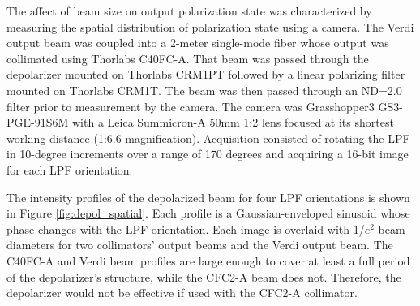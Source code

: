 The affect of beam size on output polarization state was characterized by measuring the spatial distribution of polarization state using a camera. The Verdi output beam was coupled into a 2-meter single-mode fiber whose output was collimated using Thorlabs C40FC-A. That beam was passed through the depolarizer mounted on Thorlabs CRM1PT followed by a linear polarizing filter mounted on Thorlabs CRM1T. The beam was then passed through an ND=2.0 filter prior to measurement by the camera. The camera was Grasshopper3 GS3-PGE-91S6M with a Leica Summicron-A 50mm 1:2 lens focused at its shortest working distance (1:6.6 magnification). Acquisition consisted of rotating the LPF in 10-degree increments over a range of 170 degrees and acquiring a 16-bit image for each LPF orientation.

The intensity profiles of the depolarized beam for four LPF orientations is shown in Figure \ref{fig:depol_spatial}. Each profile is a Gaussian-enveloped sinusoid whose phase changes with the LPF orientation. Each image is overlaid with 1/$e^2$ beam diameters for two collimators' output beams and the Verdi output beam. The C40FC-A and Verdi beam profiles are large enough to cover at least a full period of the depolarizer's structure, while the CFC2-A beam does not. Therefore, the depolarizer would not be effective if used with the CFC2-A collimator.
